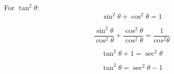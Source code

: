 \begin{minipage}{0.7\textwidth}
\begin{framed}
  For $\tan^2\theta:$
  \begin{equation*}
    \sin^2\theta + \cos^2\theta = 1
  \end{equation*}

  \begin{equation*}
    \frac{\sin^2\theta}{\cos^2\theta} + \frac{\cos^2\theta}{\cos^2\theta} = 
    \frac{1}{cos^2\theta}
  \end{equation*}

  \begin{equation*}
    \tan^2\theta + 1 = \sec^2\theta
  \end{equation*}

  \begin{equation*}
    \tan^2\theta = \sec^2\theta - 1
  \end{equation*}

\vspace{0.5cm}
\end{framed}
\end{minipage}